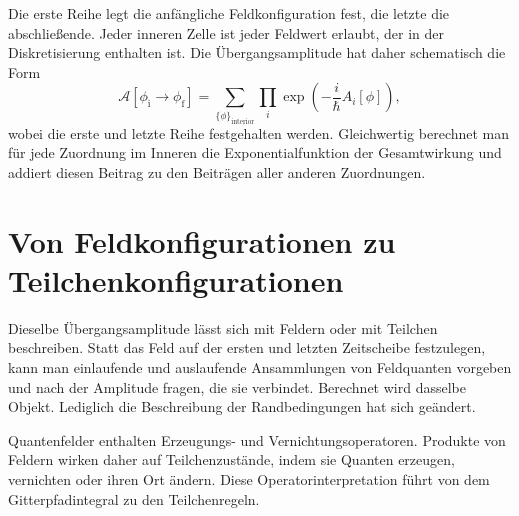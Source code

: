 Die erste Reihe legt die anfängliche Feldkonfiguration fest, die letzte die abschließende. Jeder inneren Zelle ist jeder Feldwert erlaubt, der in der Diskretisierung enthalten ist. Die Übergangsamplitude hat daher schematisch die Form
\begin{equation}
\mathcal{A}\!\left[\phi_{\mathrm{i}}\rightarrow\phi_{\mathrm{f}}\right]
=
\sum_{\{\phi\}_{\mathrm{interior}}}
\prod_i\exp\!\left(-\frac{i}{\hbar}A_i[\phi]\right),
\end{equation}
wobei die erste und letzte Reihe festgehalten werden. Gleichwertig berechnet man für jede Zuordnung im Inneren die Exponentialfunktion der Gesamtwirkung und addiert diesen Beitrag zu den Beiträgen aller anderen Zuordnungen.

\section{Von Feldkonfigurationen zu Teilchenkonfigurationen}

Dieselbe Übergangsamplitude lässt sich mit Feldern oder mit Teilchen beschreiben. Statt das Feld auf der ersten und letzten Zeitscheibe festzulegen, kann man einlaufende und auslaufende Ansammlungen von Feldquanten vorgeben und nach der Amplitude fragen, die sie verbindet. Berechnet wird dasselbe Objekt. Lediglich die Beschreibung der Randbedingungen hat sich geändert.

Quantenfelder enthalten Erzeugungs- und Vernichtungsoperatoren. Produkte von Feldern wirken daher auf Teilchenzustände, indem sie Quanten erzeugen, vernichten oder ihren Ort ändern. Diese Operatorinterpretation führt von dem Gitterpfadintegral zu den Teilchenregeln.

\begin{classroomqa}
\end{classroomqa}

